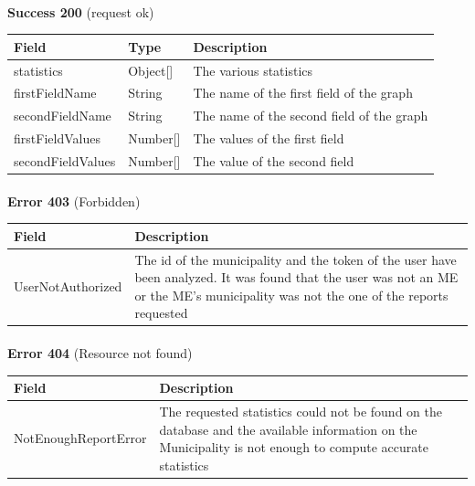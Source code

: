 						\paragraph{}
							\textbf{Success 200} (request ok)
							\begin{table}[!h]
								\begin{tabular}{L{0.25\textwidth}L{0.1\textwidth}L{0.45\textwidth}}
									\toprule
									Field & Type & Description \\
									\midrule
									statistics & Object[] & The various statistics \\
									\hspace{2.5mm}firstFieldName & String & The name of the first field of the graph \\
									\hspace{2.5mm}secondFieldName & String & The name of the second field of the graph \\
									\hspace{2.5mm}firstFieldValues & Number[] & The values of the first field \\
									\hspace{2.5mm}secondFieldValues & Number[] & The value of the second field \\
								 	\bottomrule
								\end{tabular}
							\end{table}
						\paragraph{}
							\textbf{Error 403} (Forbidden)
							\begin{table}[!h]
								\begin{tabular}{L{0.4\textwidth}L{0.4\textwidth}}
									\toprule
									Field & Description \\
									\midrule
								  	UserNotAuthorized & The id of the municipality and the token of the user have been analyzed. It was found that the user was not an ME or the ME's  municipality was not the one of the reports requested  \\
								 	\bottomrule
								\end{tabular}
							\end{table}
						\paragraph{}
							\textbf{Error 404} (Resource not found)
							\begin{table}[!h]
								\begin{tabular}{L{0.4\textwidth}L{0.4\textwidth}}
									\toprule
									Field & Description \\
									\midrule
								  	NotEnoughReportError & The requested statistics could not be found on the database and the available information on the Municipality is not enough to compute accurate statistics \\
								 	\bottomrule
								\end{tabular}
							\end{table}
						
